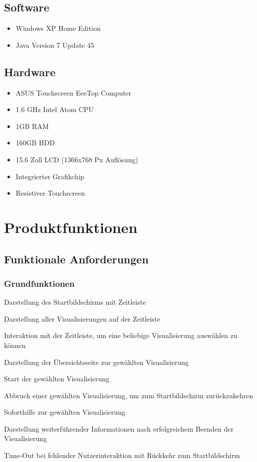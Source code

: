 \documentclass{article}
\begin{document}
\subsection{Software}

\begin{itemize}
	\item Windows XP Home Edition
	\item Java Version 7 Update 45
\end{itemize}

\subsection{Hardware}

\begin{itemize}
	\item ASUS Touchscreen \gls{EeeTop} Computer
	\item 1.6 GHz Intel Atom CPU
	\item 1GB RAM
	\item 160GB HDD
	\item 15.6 Zoll LCD (1366x768 Px Auflösung)
	\item Integrierter Grafikchip
	\item Resistiver Touchscreen
\end{itemize}

\section{Produktfunktionen}

\subsection{Funktionale Anforderungen}

\subsubsection{Grundfunktionen}

\begin{FA}[start=100]
  \item Darstellung des Startbildschirms mit Zeitleiste
  \item Darstellung aller Visualisierungen auf der Zeitleiste
  \item Interaktion mit der Zeitleiste, um eine beliebige Visualisierung auswählen zu können
  \item Darstellung der Übersichtsseite zur gewählten Visualisierung
  \item Start der gewählten Visualisierung
  \item Abbruch einer gewählten Visualisierung, um zum Startbildschirm zurückzukehren
  \item Soforthilfe zur gewählten Visualisierung
  \item Darstellung weiterführender Informationen nach erfolgreichem Beenden der Visualisierung 
  \item Time-Out bei fehlender Nutzerinteraktion mit Rückkehr zum Startbildschirm
\end{FA}
\end{document}
